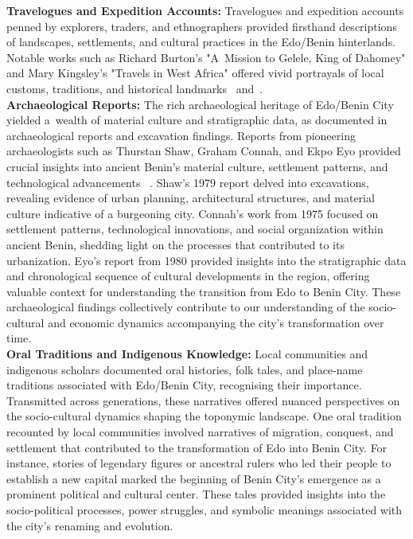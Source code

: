 \noindent\textbf{Travelogues and Expedition Accounts:} Travelogues and expedition accounts penned by explorers, traders, and ethnographers provided firsthand descriptions of landscapes, settlements, and cultural practices in the Edo/Benin hinterlands. Notable works such as Richard Burton's "A~Mission to Gelele, King of Dahomey" and Mary Kingsley's "Travels in West Africa" offered vivid portrayals of local customs, traditions, and historical landmarks~\cite{burton2011} and~\cite{kingsley1988}.\\[-2mm]

\noindent\textbf{Archaeological Reports:} The rich archaeological heritage of Edo/Benin City yielded a~wealth of material culture and stratigraphic data, as documented in archaeological reports and excavation findings. Reports from pioneering archaeologists such as Thurstan Shaw, Graham Connah, and Ekpo Eyo provided crucial insights into ancient Benin's material culture, settlement patterns, and technological advancements ~\cite{shaw1970,connah1975}. Shaw's 1979 report delved into excavations, revealing evidence of urban planning, architectural structures, and material culture indicative of a burgeoning city. Connah's work from 1975 focused on settlement patterns, technological innovations, and social organization within ancient Benin, shedding light on the processes that contributed to its urbanization. Eyo's report from 1980 provided insights into the stratigraphic data and chronological sequence of cultural developments in the region, offering valuable context for understanding the transition from Edo to Benin City. These archaeological findings collectively contribute to our understanding of the socio-cultural and economic dynamics accompanying the city's transformation over time.\\[-2mm]

\noindent\textbf{Oral Traditions and Indigenous Knowledge:} Local communities and indigenous scholars documented oral histories, folk tales, and place-name traditions associated with Edo/Benin City, recognising their importance. Transmitted across generations, these narratives offered nuanced perspectives on the socio-cultural dynamics shaping the toponymic landscape. One oral tradition recounted by local communities involved narratives of migration, conquest, and settlement that contributed to the transformation of Edo into Benin City. For instance, stories of legendary figures or ancestral rulers who led their people to establish a new capital marked the beginning of Benin City's emergence as a prominent political and cultural center. These tales provided insights into the socio-political processes, power struggles, and symbolic meanings associated with the city's renaming and evolution.

